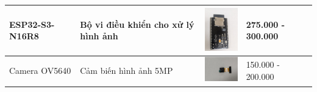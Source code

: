 \begin{table}[H]
\begin{tabular}{|l|p{5cm}|p{2cm}|l|}
 	 	\hline
 	 	ESP32-S3-N16R8 & Bộ vi điều khiển cho xử lý hình ảnh & \includegraphics[width=2cm]{figures/real_esp32_s3_2.jpg} & 275.000 - 300.000 \\
 	 	\hline
 	 	Camera OV5640 & Cảm biến hình ảnh 5MP & \includegraphics[width=2cm]{figures/real_ov5640.jpg} & 150.000 - 200.000 \\
 	 	\hline
 	\end{tabular}
\end{table}


